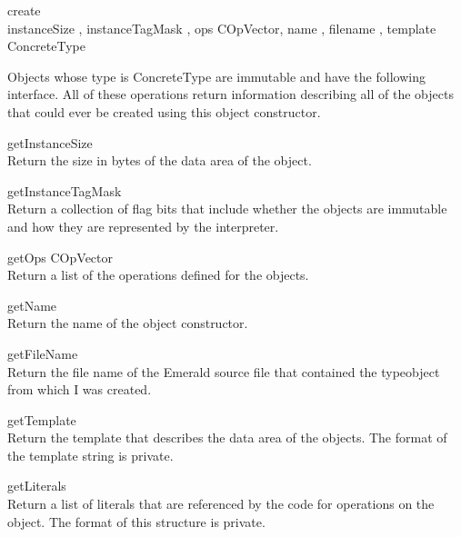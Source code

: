 \begin{desc}
  \item[\kw{operation} create\/\LB{}]~\\
    instanceSize \CO{} ,
    instanceTagMask \CO{} ,
    ops \CO{} COpVector,
    name \CO{} ,
    filename \CO{} ,
    template \CO{} \/\RB{} \returns{} \/\LB{}ConcreteType\/\RB{}
\end{desc}

Objects whose type is ConcreteType are immutable and have the following
interface. All of these operations return information describing all of the
objects that could ever be created using this object constructor.

\begin{desc}
  \item[\kw{function}  getInstanceSize \returns{} \/\LB{}\tn{Integer}\/\RB{}]~\\
    Return the size in bytes of the data area of the object.
  \item[\kw{function}  getInstanceTagMask \returns{} \/\LB{}\tn{Integer}\/\RB{}]~\\
    Return a collection of flag bits that include whether the objects are
    immutable and how they are represented by the interpreter.
  \item[\kw{function}  getOps \returns{} \/\LB{}COpVector\/\RB{}]~\\
    Return a list of the operations defined for the objects.
  \item[\kw{function}  getName \returns{} \/\LB{}\tn{String}\/\RB{}]~\\
    Return the name of the object constructor.
  \item[\kw{function}  getFileName \returns{} \/\LB{}\tn{String}\/\RB{}]~\\
    Return the file name of the Emerald source file that contained the
    typeobject from which I was created.
  \item[\kw{function}  getTemplate \returns{} \/\LB{}\tn{String}\/\RB{}]~\\
    Return the template that describes the data area of the
    objects.  The format of the template string is private.
  \item[\kw{function}  getLiterals \returns{} \/\LB{}\tn{ImmutableVectorOfInt}\/\RB{}]~\\
    Return a list of literals that are referenced by the code for operations
    on the object.  The format of this structure is private.
\end{desc}

